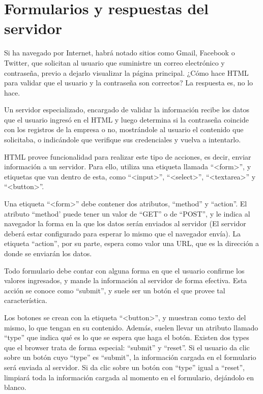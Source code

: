 \section{Formularios y respuestas del servidor}

Si ha navegado por Internet, habrá notado sitios como Gmail, Facebook o Twitter,
que solicitan al usuario que suministre un correo electrónico y contraseña,
previo a dejarlo visualizar la página principal. ¿Cómo hace HTML para validar
que el usuario y la contraseña son correctos? La respuesta es, no lo hace.

Un servidor especializado, encargado de validar la información recibe los datos
que el usuario ingresó en el HTML y luego determina si la contraseña coincide
con los registros de la empresa o no, mostrándole al usuario el contenido que
solicitaba, o indicándole que verifique sus credenciales y vuelva a intentarlo.

HTML provee funcionalidad para realizar este tipo de acciones, es decir, enviar
información a un servidor. Para ello, utiliza una etiqueta llamada ``<form>'',
y etiquetas que van dentro de esta, como ``<input>'', ``<select>'', ``<textarea>''
y ``<button>''.

Una etiqueta ``<form>'' debe contener dos atributos, ``method'' y ``action''.
El atributo ``method' puede tener un valor de ``GET'' o de ``POST'', y le indica
al navegador la forma en la que los datos serán enviados al servidor (El servidor
deberá estar configurado para esperar lo mismo que el navegador envía). La
etiqueta ``action'', por su parte, espera como valor una URL, que es la dirección
a donde se enviarán los datos.

Todo formulario debe contar con alguna forma en que el usuario confirme los
valores ingresados, y mande la información al servidor de forma efectiva. Esta
acción se conoce como ``submit'', y suele ser un botón el que provee tal
característica.

Los botones se crean con la etiqueta ``<button>'', y muestran como texto del
mismo, lo que tengan en su contenido. Además, suelen llevar un atributo llamado
``type'' que indica qué es lo que se espera que haga el botón. Existen dos types
que el browser trata de forma especial: ``submit'' y ``reset''. Si el usuario
da clic sobre un botón cuyo ``type'' es ``submit'', la información cargada
en el formulario será enviada al servidor. Si da clic sobre un botón con ``type''
igual a ``reset'', limpiará toda la información cargada al momento en el formulario,
dejándolo en blanco.

